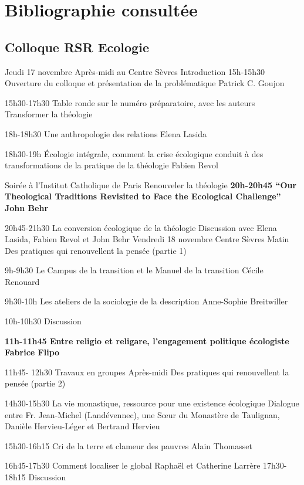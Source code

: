 \section{Bibliographie consultée}

\subsection{Colloque RSR Ecologie}


Jeudi 17 novembre  Après-midi au Centre Sèvres  Introduction  15h-15h30       
Ouverture du colloque et présentation de la problématique                           Patrick C. Goujon 

15h30-17h30 Table ronde sur le numéro préparatoire, avec les auteurs    Transformer la théologie  

18h-18h30  Une anthropologie des relations   Elena Lasida 

18h30-19h Écologie intégrale, comment la crise écologique conduit à des transformations de la pratique de la théologie  Fabien Revol 

Soirée à l’Institut Catholique de Paris  Renouveler la théologie  
\textbf{20h-20h45 “Our Theological Traditions Revisited to Face the Ecological Challenge”   John Behr }

20h45-21h30 La conversion écologique de la théologie Discussion avec Elena Lasida, Fabien Revol et John Behr  Vendredi 18 novembre  Centre Sèvres   Matin  Des pratiques qui renouvellent la pensée (partie 1)  


9h-9h30 Le Campus de la transition et le Manuel de la transition   Cécile Renouard 

9h30-10h Les ateliers de la sociologie de la description    Anne-Sophie Breitwiller 

10h-10h30 Discussion  

\textbf{11h-11h45 Entre religio et religare, l'engagement politique écologiste   Fabrice Flipo  }

11h45- 12h30 Travaux en groupes  Après-midi Des pratiques qui renouvellent la pensée (partie 2)  

14h30-15h30 La vie monastique, ressource pour une existence écologique Dialogue entre Fr. Jean-Michel (Landévennec), une Sœur du Monastère de Taulignan, Danièle Hervieu-Léger et Bertrand Hervieu  

15h30-16h15 Cri de la terre et clameur des pauvres Alain Thomasset  

16h45-17h30 Comment localiser le global   Raphaël et Catherine Larrère 17h30-18h15  Discussion      

